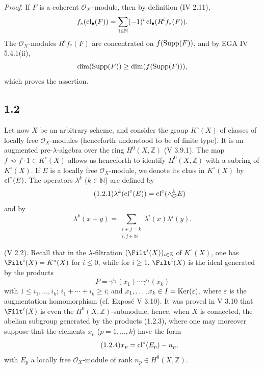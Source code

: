 \emph{Proof.}
If $F$ is a coherent $\mathcal O_{X'}$-module, then by definition (IV 2.11),
\[
f_*(\operatorname{cl}_\bullet(F))=
\sum_{i\in\mathbb N}(-1)^i\operatorname{cl}_\bullet(R^if_*(F)).
\]
The $\mathcal O_X$-modules $R^if_*(F)$ are concentrated on
$f(\operatorname{Supp}(F))$, and by EGA IV 5.4.1(ii),
\[
\dim(\operatorname{Supp}(F))\geq\dim(f(\operatorname{Supp}(F))),
\]
which proves the assertion.

\subsection*{1.2}
Let now $X$ be an arbitrary scheme, and consider the group $K^\circ(X)$ of
classes of locally free $\mathcal O_X$-modules (henceforth understood to be of
finite type). It is an augmented pre-$\lambda$-algebra over the ring
$H^0(X,\mathbb Z)$ (V 3.9.1). The map
$f\rightsquigarrow f\cdot1\in K^\circ(X)$ allows us henceforth to identify
$H^0(X,\mathbb Z)$ with a subring of $K^\circ(X)$. If $E$ is a locally free
$\mathcal O_X$-module, we denote its class in $K^\circ(X)$ by
$\operatorname{cl}^\circ(E)$. The operators $\lambda^k$ ($k\in\mathbb N$) are defined by
\begin{equation}\tag{1.2.1}
\lambda^k(\operatorname{cl}^\circ(E))=\operatorname{cl}^\circ(\wedge_{\mathcal O}^kE)
\end{equation}
and by
\begin{equation}\tag{1.2.2}
\lambda^k(x+y)=
\sum_{\substack{i+j=k\\ i,j\in\mathbb N}}\lambda^i(x)\lambda^j(y).
\end{equation}

(V 2.2). Recall that in the $\lambda$-filtration
$(\Filt^i(X))_{i\in\mathbb Z}$ of $K^\circ(X)$, one has
$\Filt^i(X)=K^\circ(X)$ for $i\leq0$, while for $i\geq1$, $\Filt^i(X)$ is
the ideal generated by the products
\begin{equation}\tag{1.2.3}
P=\gamma^{i_1}(x_1)\cdots\gamma^{i_k}(x_k)
\end{equation}
with $1\leq i_1,\ldots,i_k$; $i_1+\cdots+i_k\geq i$; and
$x_1,\ldots,x_k\in I=\operatorname{Ker}(\varepsilon)$, where $\varepsilon$ is the
augmentation homomorphism (cf. Expos\'e V 3.10). It was proved in V 3.10 that
$\Filt^i(X)$ is even the $H^0(X,\mathbb Z)$-submodule, hence, when $X$ is
connected, the abelian subgroup generated by the products (1.2.3), where one
may moreover suppose that the elements $x_p$ ($p=1,\ldots,k$) have the form
\begin{equation}\tag{1.2.4}
x_p=\operatorname{cl}^\circ(E_p)-n_p,
\end{equation}
with $E_p$ a locally free $\mathcal O_X$-module of rank
$n_p\in H^0(X,\mathbb Z)$.

